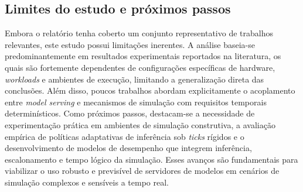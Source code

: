 \subsection{Limites do estudo e próximos passos}

Embora o relatório tenha coberto um conjunto representativo de trabalhos relevantes, este estudo possui limitações inerentes. A análise baseia-se predominantemente em resultados experimentais reportados na literatura, os quais são fortemente dependentes de configurações específicas de hardware, \emph{workloads} e ambientes de execução, limitando a generalização direta das conclusões. Além disso, poucos trabalhos abordam explicitamente o acoplamento entre \emph{model serving} e mecanismos de simulação com requisitos temporais determinísticos. Como próximos passos, destacam-se a necessidade de experimentação prática em ambientes de simulação construtiva, a avaliação empírica de políticas adaptativas de inferência sob \emph{ticks} rígidos e o desenvolvimento de modelos de desempenho que integrem inferência, escalonamento e tempo lógico da simulação. Esses avanços são fundamentais para viabilizar o uso robusto e previsível de servidores de modelos em cenários de simulação complexos e sensíveis a tempo real.

